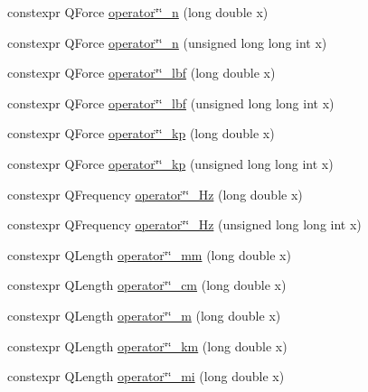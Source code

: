\begin{DoxyCompactItemize}
\item 
constexpr Q\+Force \mbox{\hyperlink{namespaceokapi_1_1literals_af29760df0e8f486842836e96f6eb073e}{operator\char`\"{}\char`\"{}\+\_\+n}} (long double x)
\item 
constexpr Q\+Force \mbox{\hyperlink{namespaceokapi_1_1literals_a5b41173a8aa88f8f5734b49468a96fa8}{operator\char`\"{}\char`\"{}\+\_\+n}} (unsigned long long int x)
\item 
constexpr Q\+Force \mbox{\hyperlink{namespaceokapi_1_1literals_a7c3d4a2dc074ee653697a1c93c4b12fb}{operator\char`\"{}\char`\"{}\+\_\+lbf}} (long double x)
\item 
constexpr Q\+Force \mbox{\hyperlink{namespaceokapi_1_1literals_ac4bd53d2c0d38c6af81494a2142f4263}{operator\char`\"{}\char`\"{}\+\_\+lbf}} (unsigned long long int x)
\item 
constexpr Q\+Force \mbox{\hyperlink{namespaceokapi_1_1literals_ada1579c899ee7af6561e231b7f663c94}{operator\char`\"{}\char`\"{}\+\_\+kp}} (long double x)
\item 
constexpr Q\+Force \mbox{\hyperlink{namespaceokapi_1_1literals_af0310e1ec8068c11f8aee0d5a2b94a38}{operator\char`\"{}\char`\"{}\+\_\+kp}} (unsigned long long int x)
\item 
constexpr Q\+Frequency \mbox{\hyperlink{namespaceokapi_1_1literals_a5eebec7681b16d83e30ec18032e85229}{operator\char`\"{}\char`\"{}\+\_\+\+Hz}} (long double x)
\item 
constexpr Q\+Frequency \mbox{\hyperlink{namespaceokapi_1_1literals_a04d29d461c1f7eb8da83798d144be459}{operator\char`\"{}\char`\"{}\+\_\+\+Hz}} (unsigned long long int x)
\item 
constexpr Q\+Length \mbox{\hyperlink{namespaceokapi_1_1literals_a6ac5a9af7e878103516a17c4f76e4cb2}{operator\char`\"{}\char`\"{}\+\_\+mm}} (long double x)
\item 
constexpr Q\+Length \mbox{\hyperlink{namespaceokapi_1_1literals_ad8a0c1bc6292d7bab8ead5d70663c34f}{operator\char`\"{}\char`\"{}\+\_\+cm}} (long double x)
\item 
constexpr Q\+Length \mbox{\hyperlink{namespaceokapi_1_1literals_ad860ceea3e6afea62c3cbf34cc423c6d}{operator\char`\"{}\char`\"{}\+\_\+m}} (long double x)
\item 
constexpr Q\+Length \mbox{\hyperlink{namespaceokapi_1_1literals_a32c66d1c5e1e1c23bd588e68ae430ecd}{operator\char`\"{}\char`\"{}\+\_\+km}} (long double x)
\item 
constexpr Q\+Length \mbox{\hyperlink{namespaceokapi_1_1literals_a726879fc529f4296a8b9e2a498f2cb7f}{operator\char`\"{}\char`\"{}\+\_\+mi}} (long double x)

\end{DoxyCompactItemize}
